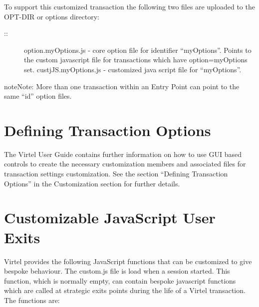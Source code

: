\documentclass[letterpaper,10pt,english]{sphinxmanual}
\begin{document}

To support this customized transaction the following two files are uploaded to the OPT-DIR or options directory:
\begin{description}
\item[{::}] \leavevmode
option.myOptions.js  - core option file for identifier “myOptions”. Points to the custom javascript file for transactions which have option=myOptions set.
custjJS.myOptions.js - customized java script file for “myOptions”.

\end{description}

\begin{sphinxadmonition}{note}{Note:}
More than one transaction within an Entry Point can point to the same “id” option files.
\end{sphinxadmonition}

\ignorespaces 

\section{Defining Transaction Options}
\label{\detokenize{Customization:defining-transaction-options}}\label{\detokenize{Customization:index-6}}
The Virtel User Guide contains further information on how to use GUI based controls to create the necessary customization members and associated files for transaction settings customization. See the section “Defining Transaction Options” in the Customization section for further details.

\ignorespaces 

\section{Customizable JavaScript User Exits}
\label{\detokenize{Customization:customizable-javascript-user-exits}}\label{\detokenize{Customization:index-7}}
Virtel provides the following JavaScript functions that can be customized to give bespoke behaviour. The custom.js file is load when a session started. This function, which is normally empty, can contain bespoke javascript functions which are called at strategic exits points during the life of a Virtel transaction. The functions are:
\end{document}
